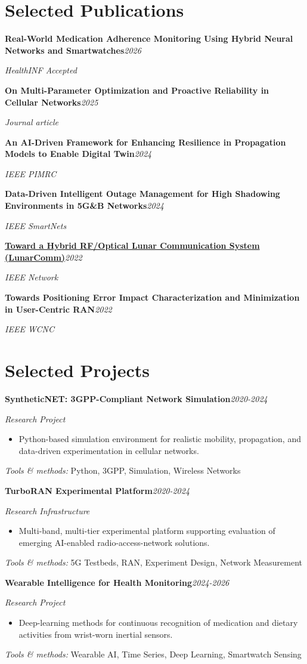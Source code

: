 \documentclass[9pt,letterpaper]{extarticle}
\newcommand{\entry}[2]{\Needspace{4\baselineskip}\textbf{#1}\hfill\textit{#2}\par}
\begin{document}
\section{Selected Publications}
\entry{Real-World Medication Adherence Monitoring Using Hybrid Neural Networks and Smartwatches}{2026}
\textit{HealthINF \textbar{} Accepted}\par
\entry{On Multi-Parameter Optimization and Proactive Reliability in Cellular Networks}{2025}
\textit{Journal article}\par
\entry{An AI-Driven Framework for Enhancing Resilience in Propagation Models to Enable Digital Twin}{2024}
\textit{IEEE PIMRC}\par
\entry{Data-Driven Intelligent Outage Management for High Shadowing Environments in 5G\&B Networks}{2024}
\textit{IEEE SmartNets}\par
\entry{\href{https://arxiv.org/abs/2203.15899}{Toward a Hybrid RF/Optical Lunar Communication System (LunarComm)}}{2022}
\textit{IEEE Network}\par
\entry{Towards Positioning Error Impact Characterization and Minimization in User-Centric RAN}{2022}
\textit{IEEE WCNC}\par
{}
\section{Selected Projects}
\entry{SyntheticNET: 3GPP-Compliant Network Simulation}{2020-2024}
\textit{Research Project}\par
\begin{itemize}
\item Python-based simulation environment for realistic mobility, propagation, and data-driven experimentation in cellular networks.
\end{itemize}
{\small\textit{Tools \& methods:} Python, 3GPP, Simulation, Wireless Networks\par}
\entry{TurboRAN Experimental Platform}{2020-2024}
\textit{Research Infrastructure}\par
\begin{itemize}
\item Multi-band, multi-tier experimental platform supporting evaluation of emerging AI-enabled radio-access-network solutions.
\end{itemize}
{\small\textit{Tools \& methods:} 5G Testbeds, RAN, Experiment Design, Network Measurement\par}
\entry{Wearable Intelligence for Health Monitoring}{2024-2026}
\textit{Research Project}\par
\begin{itemize}
\item Deep-learning methods for continuous recognition of medication and dietary activities from wrist-worn inertial sensors.
\end{itemize}
{\small\textit{Tools \& methods:} Wearable AI, Time Series, Deep Learning, Smartwatch Sensing\par}
\end{document}
